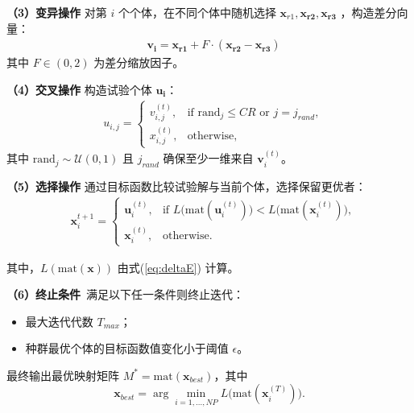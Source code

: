 \noindent\textbf{（3）变异操作}
对第 $i$ 个个体，在不同个体中随机选择 $\mathbf{x}_{r1},\mathbf{x_{r2}},\mathbf{x_{r3}}$ ，构造差分向量：
\begin{equation}
\begin{aligned}
  &\mathbf{v_{i}}=\mathbf{x_{r1}}+F\cdot (\mathbf{x_{r2}}-\mathbf{x_{r3}})
\end{aligned}
\end{equation}
其中 $F\in (0,2)$ 为差分缩放因子。

\noindent\textbf{（4）交叉操作}
构造试验个体 $\mathbf{u_{i}}$：
\begin{equation}
\begin{aligned}
  &u_{i,j}=
  \begin{cases}
    v_{i,j}^{(t)},&\text{if } \mathrm{rand}_j\le CR\text{ or } j=j_{rand},\\
    x_{i,j}^{(t)},&\text{otherwise},
  \end{cases}
\end{aligned}
\end{equation}
其中 $\mathrm{rand}_j\sim\mathcal{U}(0,1)$ 且 $j_{rand}$ 确保至少一维来自 $\mathbf{v}_i^{(t)}$。

\noindent\textbf{（5）选择操作}
通过目标函数比较试验解与当前个体，选择保留更优者：
\begin{equation}
\begin{aligned}
  &\mathbf{x}_{i}^{t+1}=
  \begin{cases}
    \mathbf{u}_i^{(t)},&\text{if } L\bigl(\mathrm{mat}(\mathbf{u}_i^{(t)})\bigr)<L\bigl(\mathrm{mat}(\mathbf{x}_i^{(t)})\bigr),\\
    \mathbf{x}_i^{(t)},&\text{otherwise}.
  \end{cases}
\end{aligned}
\end{equation}

其中，$L(\mathrm{mat}(\mathbf{x}))$ 由式(\ref{eq:deltaE}) 计算。

\noindent\textbf{（6）终止条件}\
满足以下任一条件则终止迭代：
\begin{itemize}
  \item 最大迭代代数 $T_{max}$；
  \item 种群最优个体的目标函数值变化小于阈值 $\epsilon$。
\end{itemize}

最终输出最优映射矩阵 $M^*=\mathrm{mat}(\mathbf{x}_{best})$，其中
\begin{equation}\label{eq:best_solution}
  \mathbf{x}_{best} = \arg\min_{i=1,\dots,NP} L\bigl(\mathrm{mat}(\mathbf{x}_i^{(T)})\bigr).
\end{equation}


